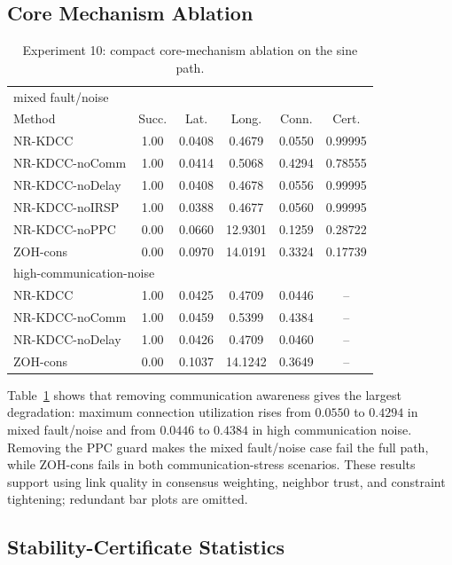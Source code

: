 \documentclass[twocolumn,3p,times,procedia]{elsarticle}
\newcommand{\Method}{NR-KDCC}
\newcommand{\ZOHcons}{ZOH-cons}
\begin{document}
\subsection{Core Mechanism Ablation}

\begin{table}[!tbp]
\centering
\caption{Experiment 10: compact core-mechanism ablation on the sine path.}
\label{tab:e2_ablation}
\scriptsize
\setlength{\tabcolsep}{2.2pt}
\begin{tabular}{lccccc}
\toprule
\multicolumn{6}{l}{mixed fault/noise}\\
Method & Succ. & Lat. & Long. & Conn. & Cert.\\
\midrule
\Method{} & 1.00 & 0.0408 & 0.4679 & 0.0550 & 0.99995\\
\Method{}-noComm & 1.00 & 0.0414 & 0.5068 & 0.4294 & 0.78555\\
\Method{}-noDelay & 1.00 & 0.0408 & 0.4678 & 0.0556 & 0.99995\\
\Method{}-noIRSP & 1.00 & 0.0388 & 0.4677 & 0.0560 & 0.99995\\
\Method{}-noPPC & 0.00 & 0.0660 & 12.9301 & 0.1259 & 0.28722\\
\ZOHcons{} & 0.00 & 0.0970 & 14.0191 & 0.3324 & 0.17739\\
\midrule
\multicolumn{6}{l}{high-communication-noise}\\
\Method{} & 1.00 & 0.0425 & 0.4709 & 0.0446 & --\\
\Method{}-noComm & 1.00 & 0.0459 & 0.5399 & 0.4384 & --\\
\Method{}-noDelay & 1.00 & 0.0426 & 0.4709 & 0.0460 & --\\
\ZOHcons{} & 0.00 & 0.1037 & 14.1242 & 0.3649 & --\\
\bottomrule
\end{tabular}
\end{table}

Table~\ref{tab:e2_ablation} shows that removing communication awareness gives the largest degradation: maximum connection utilization rises from $0.0550$ to $0.4294$ in mixed fault/noise and from $0.0446$ to $0.4384$ in high communication noise. Removing the PPC guard makes the mixed fault/noise case fail the full path, while \ZOHcons{} fails in both communication-stress scenarios. These results support using link quality in consensus weighting, neighbor trust, and constraint tightening; redundant bar plots are omitted.

\subsection{Stability-Certificate Statistics}
\end{document}
